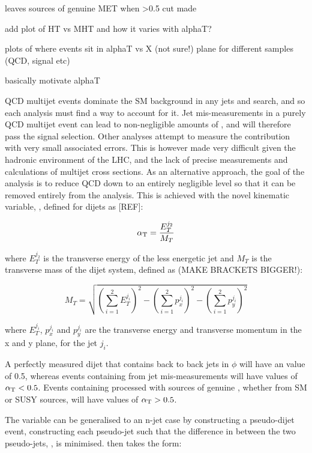 leaves sources of genuine MET when >0.5 cut made

add plot of HT vs MHT and how it varies with alphaT?

plots of where events sit in alphaT vs X (not sure!) plane for different samples (QCD, signal etc)

basically motivate alphaT

QCD multijet events dominate the SM background in any jets and \met search, and 
so each analysis must find a way to account for it. Jet mis-measurements in a 
purely QCD multijet event can lead to non-negligible amounts of \mht, and will 
therefore pass the signal selection. 
Other analyses attempt
to measure the contribution with very small associated errors. This is however 
made very difficult given the hadronic environment of the LHC, and the lack of 
precise measurements and calculations of multijet cross sections. As an 
alternative approach, the goal of the 
\alphat analysis is to reduce QCD down to an entirely negligible level so that 
it can be removed entirely from the analysis. This is 
achieved with the novel kinematic variable, \alphat, defined for dijets as [REF]:

\begin{equation}
\alpha_{\text{T}} = \frac{E_T^{j_2}}{M_T}
\label{eq:alphat_dijet}
\end{equation}

where $E_T^{j_2}$ is the transverse energy of the less energetic jet and $M_T$ 
is the transverse mass of the dijet system, defined as (MAKE BRACKETS BIGGER!):

\begin{equation}
M_T = \sqrt{(\sum^2_{i=1}{E_T^{j_i}})^2 - (\sum^2_{i=1}{p_x^{j_i}})^2 - (\sum^2_{i=1}{p_y^{j_i}})^2}
\label{eq:mt}
\end{equation}

where $E_T^{j_i}$, $p_x^{j_i}$ and $p_y^{j_i}$ are the transverse energy and 
transverse momentum in the x and y plane, for the jet $j_i$.

A perfectly measured dijet that contains back to back jets in $\phi$ will have an
\alphat value of 0.5, whereas 
events containing \mht from jet mis-measurements will have values of $\alpha_{\text{T}}<0.5$.
Events
containing processed with sources of genuine \met, whether from SM or SUSY 
sources, will have values of $\alpha_{\text{T}} > 0.5$. 

The \alphat variable can be generalised to an n-jet case by constructing a 
pseudo-dijet event, constructing each pseudo-jet such that the difference in \HT
between the two pseudo-jets, \deltaHT, is minimised. \alphat then takes the 
form:

